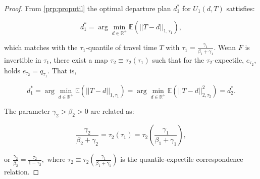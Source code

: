 \documentclass[
]{article}
\theoremstyle{definition}
\theoremstyle{definition}
\theoremstyle{definition}
\theoremstyle{definition}
\theoremstyle{remark}
\begin{document}
\begin{proof}
From \ref{prp:proputil} the optimal departure plan \(d_1^*\) for \(U_1(d,T)\) sattisfies:

\[d_1^* = \arg\min_{d\in \mathbb R^+}\mathbb E\left(||T-d||_{1,\tau_1}\right),\]

which matches with the \(\tau_1\)-quantile of travel time \(T\) with \(\tau_1=\frac{\gamma_1}{\beta_1+\gamma_1}\). Wenn \(F\) is invertible in \(\tau_1\), there exist a map \(\tau_2\equiv\tau_2(\tau_1)\) such that for the \(\tau_2\)-expectile, \(e_{\tau_2}\), holds \(e_{\tau_2} = q_{\tau_1}\). That is,

\[d_1^* = \arg\min_{d\in \mathbb R^+}\mathbb E\left(||T-d||_{1,\tau_1}\right) = \arg\min_{d\in \mathbb R^+}\mathbb E\left(||T-d||_{2,\tau_2}^2\right) = d_2^*.\]

The parameter \(\gamma_2>\beta_2>0\) are related as:

\begin{equation}\frac{\gamma_2}{\beta_2+\gamma_2} = \tau_2(\tau_1) = \tau_2\left(\frac{\gamma_1}{\beta_1+\gamma_1}\right), \label{eq:tcor}
\end{equation}

or \(\frac{\gamma_2}{\beta_2} = \frac{\tau_2}{1-\tau_2},\) where \(\tau_2\equiv \tau_2\left(\frac{\gamma_1}{\beta_1+\gamma_1}\right)\) is the quantile-expectile correspondence relation.
\end{proof}
\end{document}
